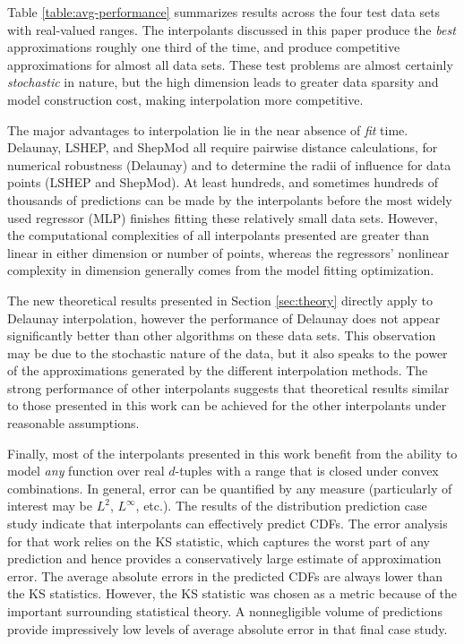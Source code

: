 \documentclass[smallextended,final]{svjour3}  %
\begin{document}
Table \ref{table:avg-performance} summarizes results across the four
test data sets with real-valued ranges. The interpolants discussed in
this paper produce the \textit{best} approximations roughly one third
of the time, and produce competitive approximations for almost all
data sets. These test problems are almost certainly
\textit{stochastic} in nature, but the high dimension leads to greater
data sparsity and model construction cost, making interpolation more
competitive.

The major advantages to interpolation lie in the near absence of
\textit{fit} time. Delaunay, LSHEP, and ShepMod all require pairwise
distance calculations, for numerical robustness (Delaunay) and to
determine the radii of influence for data points (LSHEP and
ShepMod). At least hundreds, and sometimes hundreds of thousands of
predictions can be made by the interpolants before the most widely
used regressor (MLP) finishes fitting these relatively small data
sets.  However, the computational complexities of all interpolants
presented are greater than linear in either dimension or number of
points, whereas the regressors' nonlinear complexity in dimension
generally comes from the model fitting optimization.

The new theoretical results presented in Section \ref{sec:theory}
directly apply to Delaunay interpolation, however the performance of
Delaunay does not appear significantly better than other algorithms on
these data sets.  This observation may be due to the stochastic nature
of the data, but it also speaks to the power of the approximations
generated by the different interpolation methods.  The strong
performance of other interpolants suggests that theoretical results
similar to those presented in this work can be achieved for the other
interpolants under reasonable assumptions.

Finally, most of the interpolants presented in this work benefit from
the ability to model \textit{any} function over real $d$-tuples with a
range that is closed under convex combinations. In general, error can
be quantified by any measure (particularly of interest may be
$L^2$, $L^\infty$, etc.). The results of the distribution prediction
case study indicate that interpolants can effectively predict
CDFs. The error analysis for that work relies on the KS statistic,
which captures the worst part of any prediction and hence provides a
conservatively large estimate of approximation error. The average
absolute errors in the predicted CDFs are always lower than the KS
statistics. However, the KS statistic was chosen as a metric because
of the important surrounding statistical theory. A nonnegligible
volume of predictions provide impressively low levels of average
absolute error in that final case study.
\end{document}
